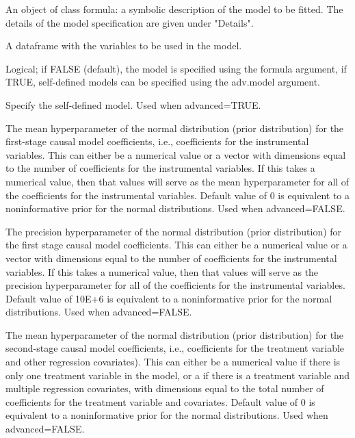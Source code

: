 \documentclass[a4paper]{book}
\begin{document}
%
\begin{Arguments}
\begin{ldescription}
\item[\code{formula}] An object of class formula: a symbolic description of the model to be fitted.
The details of the model specification are given under "Details".

\item[\code{data}] A dataframe with the variables to be used in the model.

\item[\code{advanced}] Logical; if FALSE (default), the model is specified using the formula argument,
if TRUE, self-defined models can be specified using the adv.model argument.

\item[\code{adv.model}] Specify the self-defined model. Used when advanced=TRUE.

\item[\code{b0}] The mean hyperparameter of the normal distribution (prior distribution)
for the first-stage causal model coefficients, i.e., coefficients for the instrumental variables.
This can either be a numerical value or a vector with dimensions equal to the number of coefficients
for the instrumental variables. If this takes a numerical value, then that values will
serve as the mean hyperparameter for all of the coefficients for the instrumental variables.
Default value of 0 is equivalent to a noninformative prior for the normal distributions.
Used when advanced=FALSE.

\item[\code{B0}] The precision hyperparameter of the normal distribution (prior distribution)
for the first stage causal model coefficients.
This can either be a numerical value or a vector with dimensions equal to the number of coefficients
for the instrumental variables. If this takes a numerical value, then that values will
serve as the precision hyperparameter for all of the coefficients for the instrumental variables.
Default value of 10E+6 is equivalent to a noninformative prior for the normal distributions.
Used when advanced=FALSE.

\item[\code{g0}] The mean hyperparameter of the normal distribution (prior distribution)
for the second-stage causal model coefficients,
i.e., coefficients for the treatment variable and other regression covariates).
This can either be a numerical value if there is only one treatment variable in the model,
or a if there is a treatment variable and multiple regression covariates,
with dimensions equal to the total number of coefficients for the treatment variable and covariates.
Default value of 0 is equivalent to a noninformative prior for the normal distributions.
Used when advanced=FALSE.


\end{ldescription}
\end{Arguments}
\end{document}
